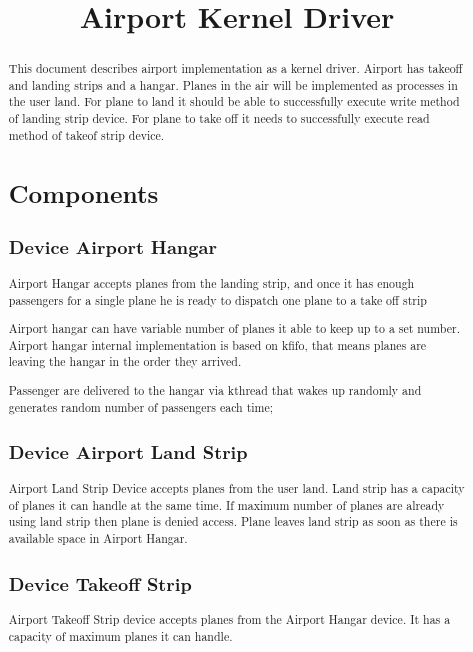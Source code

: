 \documentclass[10pt,twoside,a4paper]{article}
\begin{document}
\title{Airport Kernel Driver}
\maketitle

\begin{abstract}
This document describes airport implementation as a kernel driver. Airport has takeoff and landing strips and a hangar. Planes in the air will be implemented as processes in the user land. For plane to land it should be able to successfully execute write method of landing strip device. For plane to take off it needs to successfully execute read method of takeof strip device.

\tableofcontents

\section{Components}
\subsection{Device Airport Hangar}
Airport Hangar accepts planes from the landing strip, and once it has enough passengers for a single plane he is ready to dispatch one plane to a take off strip

Airport hangar can have variable number of planes it able to keep up to a set number. Airport hangar internal implementation is based on kfifo, that means planes are leaving the hangar in the order they arrived.

Passenger are delivered to the hangar via kthread that wakes up randomly and generates random number of passengers each time;

\subsection{Device Airport Land Strip}
Airport Land Strip Device accepts planes from the user land. Land strip has a capacity of planes it can handle at the same time. If maximum number of planes are already using land strip then plane is denied access. Plane leaves land strip as soon as there is available space in Airport Hangar.

\subsection{Device Takeoff Strip}
Airport Takeoff Strip device accepts planes from the Airport Hangar device. It has a capacity of maximum planes it can handle.


\end{abstract}
\end{document}

